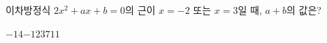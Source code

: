 이차방정식 $2x^2+ax+b=0$의 근이 $x=-2$ 또는 $x=3$일 때, $a+b$의 값은? 
\begin{choices32}{$-14$}{$-12$}{$3$}{$7$}{$11$}\end{choices32}
